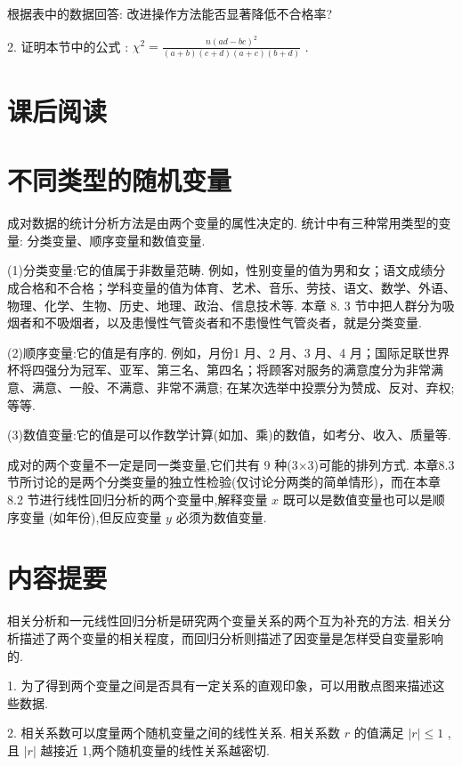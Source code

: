 \documentclass[10pt]{article}
\newcommand*\circled[1]{\tikz[baseline=(char.base)]{\node[shape=circle,draw,inner sep=1.5pt] (char) {\small #1};}}
\begin{document}
根据表中的数据回答: 改进操作方法能否显著降低不合格率?

2. 证明本节中的公式 \circled{1} : \({\chi }^{2} = \frac{n{\left( ad - bc\right) }^{2}}{\left( {a + b}\right) \left( {c + d}\right) \left( {a + c}\right) \left( {b + d}\right) }\) .

\section*{课后阅读}

\section*{不同类型的随机变量}

成对数据的统计分析方法是由两个变量的属性决定的. 统计中有三种常用类型的变量: 分类变量、顺序变量和数值变量.

(1)分类变量:它的值属于非数量范畴. 例如，性别变量的值为男和女；语文成绩分成合格和不合格；学科变量的值为体育、艺术、音乐、劳技、语文、数学、外语、物理、化学、生物、历史、地理、政治、信息技术等. 本章 8. 3 节中把人群分为吸烟者和不吸烟者，以及患慢性气管炎者和不患慢性气管炎者，就是分类变量.

(2)顺序变量:它的值是有序的. 例如，月份1 月、2 月、3 月、4 月；国际足联世界杯将四强分为冠军、亚军、第三名、第四名；将顾客对服务的满意度分为非常满意、满意、一般、不满意、非常不满意; 在某次选举中投票分为赞成、反对、弃权; 等等.

(3)数值变量:它的值是可以作数学计算(如加、乘)的数值，如考分、收入、质量等.

成对的两个变量不一定是同一类变量,它们共有 9 种(3×3)可能的排列方式. 本章8.3 节所讨论的是两个分类变量的独立性检验(仅讨论分两类的简单情形)，而在本章 8.2 节进行线性回归分析的两个变量中,解释变量 \(x\) 既可以是数值变量也可以是顺序变量 (如年份),但反应变量 \(y\) 必须为数值变量.

\section*{内容提要}

相关分析和一元线性回归分析是研究两个变量关系的两个互为补充的方法. 相关分析描述了两个变量的相关程度，而回归分析则描述了因变量是怎样受自变量影响的.

1. 为了得到两个变量之间是否具有一定关系的直观印象，可以用散点图来描述这些数据.

2. 相关系数可以度量两个随机变量之间的线性关系. 相关系数 \(r\) 的值满足 \(\left| r\right|  \leq  1\) , 且 \(\left| r\right|\) 越接近 1,两个随机变量的线性关系越密切.
\end{document}
